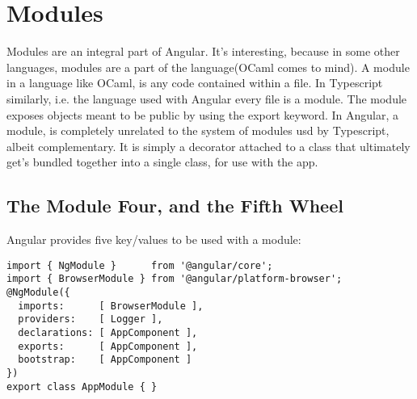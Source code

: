 \section{ Modules }
\maketitle{}

Modules are an integral part of Angular. It's interesting, because in some
other languages, modules are a part of the language(OCaml comes to mind). A
module in a language like OCaml, is any code contained within a file. In
Typescript similarly, i.e. the language used with Angular every file is a
module. The module exposes objects meant to be public by using the export
keyword. In Angular, a module, is completely unrelated to the system of modules
usd by Typescript, albeit complementary. It is simply a decorator attached to a
class that ultimately get's bundled together into a single class, for use with
the app.

\subsection{The Module Four, and the Fifth Wheel}
Angular provides five key/values to be used with a module:
\begin{lstlisting}
import { NgModule }      from '@angular/core';
import { BrowserModule } from '@angular/platform-browser';
@NgModule({
  imports:      [ BrowserModule ],
  providers:    [ Logger ],
  declarations: [ AppComponent ],
  exports:      [ AppComponent ],
  bootstrap:    [ AppComponent ]
})
export class AppModule { }
\end{lstlisting}

